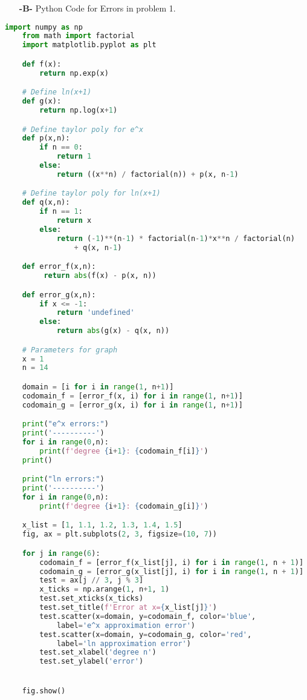 \documentclass[11pt]{article}
\theoremstyle{definition}
\newcommand{\1}[1]{\mathbf{1} \left \{ #1 \right \}}
\begin{document}
\begin{itemize}
    \item[{\textbf{-B-}}] Python Code for Errors in problem 1.
\end{itemize}
\begin{lstlisting}[language=Python]
    import numpy as np
    from math import factorial
    import matplotlib.pyplot as plt

    def f(x):
        return np.exp(x)

    # Define ln(x+1)
    def g(x):
        return np.log(x+1)

    # Define taylor poly for e^x
    def p(x,n):
        if n == 0:
            return 1
        else:
            return ((x**n) / factorial(n)) + p(x, n-1)

    # Define taylor poly for ln(x+1)
    def q(x,n):
        if n == 1:
            return x
        else:
            return (-1)**(n-1) * factorial(n-1)*x**n / factorial(n)
                + q(x, n-1)

    def error_f(x,n):
         return abs(f(x) - p(x, n))

    def error_g(x,n):
        if x <= -1:
            return 'undefined'
        else:
            return abs(g(x) - q(x, n))

    # Parameters for graph
    x = 1
    n = 14

    domain = [i for i in range(1, n+1)]
    codomain_f = [error_f(x, i) for i in range(1, n+1)]
    codomain_g = [error_g(x, i) for i in range(1, n+1)]

    print("e^x errors:")
    print('----------')
    for i in range(0,n):
        print(f'degree {i+1}: {codomain_f[i]}')
    print()

    print("ln errors:")
    print('----------')
    for i in range(0,n):
        print(f'degree {i+1}: {codomain_g[i]}')

    x_list = [1, 1.1, 1.2, 1.3, 1.4, 1.5]
    fig, ax = plt.subplots(2, 3, figsize=(10, 7))

    for j in range(6):
        codomain_f = [error_f(x_list[j], i) for i in range(1, n + 1)]
        codomain_g = [error_g(x_list[j], i) for i in range(1, n + 1)]
        test = ax[j // 3, j % 3]
        x_ticks = np.arange(1, n+1, 1)
        test.set_xticks(x_ticks)
        test.set_title(f'Error at x={x_list[j]}')
        test.scatter(x=domain, y=codomain_f, color='blue',
            label='e^x approximation error')
        test.scatter(x=domain, y=codomain_g, color='red',
            label='ln approximation error')
        test.set_xlabel('degree n')
        test.set_ylabel('error')


    fig.show()
\end{lstlisting}
\end{document}
